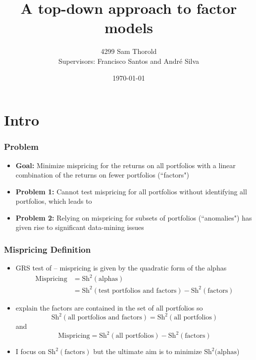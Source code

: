 \documentclass[notes]{beamer}  %
\title[Asset-Pricing]{A top-down approach to factor models}
\author[Thorold]{4299 Sam Thorold\\
                 Supervisors: Francisco Santos and Andr\'e Silva}
\institute{NHH and Nova SBE}
\date[June 2018]{\today}
\begin{document}
\frame{\titlepage}

\section{Intro}

\begin{frame} \frametitle{Problem}
  \begin{itemize}
    \item \textbf{Goal:} Minimize mispricing for the returns on all portfolios with a linear combination of the returns on fewer portfolios (``factors")
    \item \textbf{Problem 1:} Cannot test mispricing for all portfolios without identifying all portfolios, which leads to
    \item \textbf{Problem 2:} Relying on mispricing for subsets of portfolios (``anomalies") has given rise to significant data-mining issues
  \end{itemize}
\end{frame}


\begin{frame} \frametitle{Mispricing Definition}
  \begin{itemize}
    \item GRS test of \textcite{gibbons1989test} -- mispricing is given by the quadratic form of the alphas
      \begin{align*}
        \text{Mispricing} &= \text{Sh}^2(\text{alphas})\\
                          &= \text{Sh}^2(\text{test portfolios and factors}) - \text{Sh}^2(\text{factors})
      \end{align*}
    \item \textcite{barillas2016alpha} explain the factors are contained in the set of all portfolios so
    $$
      \text{Sh}^2(\text{all portfolios and factors}) = \text{Sh}^2(\text{all portfolios})
    $$
    and
    $$
      \text{Mispricing} = \text{Sh}^2(\text{all portfolios}) - \text{Sh}^2(\text{factors})
    $$
    \item I focus on $\text{Sh}^2(\text{factors})$ but the ultimate aim is to minimize $\text{Sh}^2(\text{alphas}$)
  \end{itemize}
\end{frame}
\end{document}
